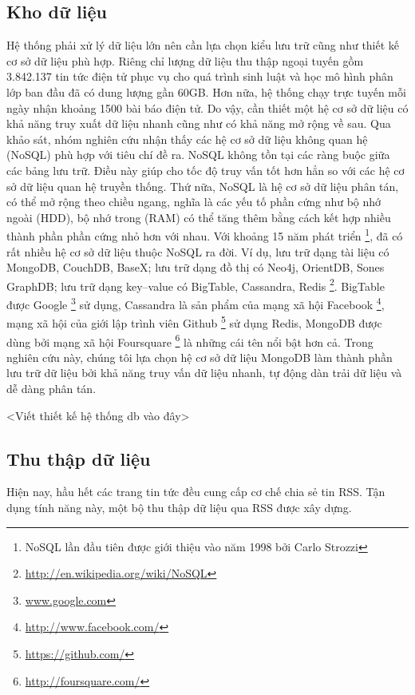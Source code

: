 \subsection{Kho dữ liệu}
\label{db}
\noindent Hệ thống phải xử lý dữ liệu lớn nên cần lựa chọn kiểu lưu trữ cũng như thiết kế cơ sở dữ liệu phù hợp. Riêng chỉ lượng dữ liệu thu thập ngoại tuyến gồm 3.842.137 tin tức điện tử phục vụ cho quá trình sinh luật và học mô hình phân lớp ban đầu đã có dung lượng gần 60GB. Hơn nữa, hệ thống chạy trực tuyến mỗi ngày nhận khoảng 1500 bài báo điện tử. Do vậy, cần thiết một hệ cơ sở dữ liệu có khả năng truy xuất dữ liệu nhanh cũng như có khả năng mở rộng về sau. Qua khảo sát, nhóm nghiên cứu nhận thấy các hệ cơ sở dữ liệu không quan hệ (NoSQL) phù hợp với tiêu chí đề ra. NoSQL không tồn tại các ràng buộc giữa các bảng lưu trữ. Điều này giúp cho tốc độ truy vấn tốt hơn hẳn so với các hệ cơ sở dữ liệu quan hệ truyền thống. Thứ nữa, NoSQL là hệ cơ sở dữ liệu phân tán, có thể mở rộng theo chiều ngang, nghĩa là các yếu tố phần cứng như bộ nhớ ngoài (HDD), bộ nhớ trong (RAM) có thể tăng thêm bằng cách kết hợp nhiều thành phần phần cứng nhỏ hơn với nhau. Với khoảng 15 năm phát triển \footnote{NoSQL lần đầu tiên được giới thiệu vào năm 1998 bởi Carlo Strozzi}, đã có rất nhiều hệ cơ sở dữ liệu thuộc NoSQL ra đời. Ví dụ, lưu trữ dạng tài liệu có MongoDB, CouchDB, BaseX; lưu trữ dạng đồ thị có Neo4j, OrientDB, Sones GraphDB; lưu trữ dạng key--value có BigTable, Cassandra, Redis \footnote{\href{http://http://en.wikipedia.org/wiki/NoSQL}{http://en.wikipedia.org/wiki/NoSQL}}. BigTable được Google \footnote{\href{www.google.com}{www.google.com}} sử dụng, Cassandra là sản phẩm của mạng xã hội Facebook \footnote{\href{http://www.facebook.com/}{http://www.facebook.com/}}, mạng xã hội của giới lập trình viên Github \footnote{\href{http://github.com/}{https://github.com/}} sử dụng Redis, MongoDB được dùng bởi mạng xã hội Foursquare \footnote{\href{http://foursquare.com/}{http://foursquare.com/}} là những cái tên nổi bật hơn cả.  Trong nghiên cứu này, chúng tôi lựa chọn hệ cơ sở dữ liệu MongoDB làm thành phần lưu trữ dữ liệu bởi khả năng truy vấn dữ liệu nhanh, tự động dàn trải dữ liệu và dễ dàng phân tán.

<Viết thiết kế hệ thống db vào đây>

\subsection{Thu thập dữ liệu}
\label{datacrawler}
\noindent Hiện nay, hầu hết các trang tin tức đều cung cấp cơ chế chia sẻ tin RSS. Tận dụng tính năng này, một bộ thu thập dữ liệu qua RSS được xây dựng.




